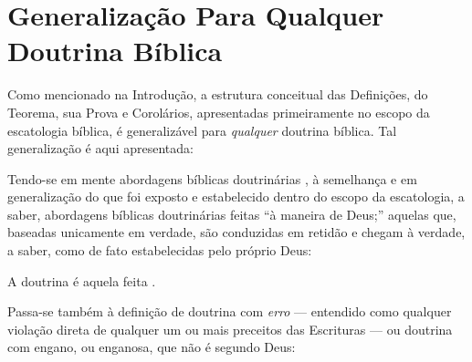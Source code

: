 
\appendix



\section{Generalização Para Qualquer Doutrina Bí\-bli\-ca}

    Como mencionado na Introdução, a estrutura conceitual das Definições, do  Teorema,  sua  Prova  e  Corolários,  apresentadas
    primeiramente no escopo da escatologia bíblica, é generalizável para \emph{qualquer} doutrina bíblica. Tal  generalização  é
    aqui apresentada:

    Tendo-se em mente abordagens bíblicas doutrinárias , à semelhança e em generalização do
    que foi exposto e estabelecido dentro do escopo da escatologia, a saber, abordagens bíblicas doutrinárias feitas ``à maneira
    de Deus;'' aquelas que, baseadas unicamente em verdade, são conduzidas em retidão e chegam à verdade, a saber, como de  fato
    estabelecidas pelo próprio Deus:

    \begin{DEF}
        \label{def.dou.segDeus}
        A doutrina  é aquela feita .
    \end{DEF}

    Passa-se também à definição de doutrina com \emph{erro} --- entendido como qualquer violação direta de qualquer um  ou  mais
    preceitos das Escrituras --- ou doutrina com engano, ou enganosa, que não é segundo Deus:

